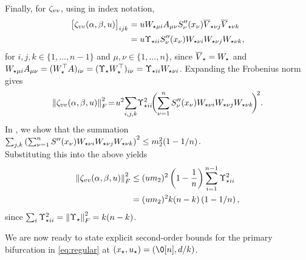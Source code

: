 \documentclass[a4paper]{cas-dc}
\begin{document}
Finally, for \(\zvv\), using  in index notation,
\begin{align*}
    \bigl[\zvv[u]\bigr]_{ijk} & = u \W[\mu i] A_{\mu\nu} S''_{\nu}(x_{\nu}) \Vbar[\nu j] \Vbar[\nu k] \\
                              & = u \U[ii] S''_{\nu}(x_{\nu}) \W[\nu i] \W[\nu j] \W[\nu k],
\end{align*}
for \(i,j,k \in \{1,\dots,n-1\}\) and \(\mu,\nu \in \{1,\dots,n\}\), since \(\Vbar = \W\) and \(\W[\mu i]A_{\mu\nu} = (\W^{\top} A)_{i\nu} = (\U\W^{\top})_{i\nu} = \U[ii]\W[\nu i]\).
Expanding the Frobenius norm gives
\begin{equation*}
    \norm{\zvv[u]}_F^2 \! = \! u^{2}\!\sum_{i,j,k}\!\U[ii]^{2}\!\biggl(\sum_{\nu=1}^{n} S''_{\nu}(x_{\nu}) \W[\nu i]\W[\nu j]\W[\nu k]\!\biggr)^{\!2}.
\end{equation*}
In , we show that the summation \\ \(\sum_{j,k} \left(\sum_{\nu=1}^{n} S''(x_\nu) \W[\nu i]\W[\nu j]\W[\nu k]\right)^{2} \le m_2^2(1-1/n)\). \\
Substituting this into the above yields
\begin{align}
    \norm{\zvv[u]}_F^2 & \le (u m_2)^2 \left(1-\frac1n\right) \sum_{i=1}^{n-1}\U[ii]^2 \notag \\
                       & = (u m_2)^2 k(n-k)\left(1-1/n\right), \label{hopf:zvv-regular}
\end{align}
since \(\sum_{i} \U[ii]^2 = \norm{\U}_F^2 = k(n-k)\).

We are now ready to state explicit second-order bounds for the primary bifurcation in \eqref{eq:regular} at \((x_{\star},u_{\star})=(\0[n],d/k)\).
\end{document}
